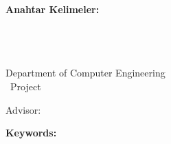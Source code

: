 \abstractTextTurkish

{\bfseries Anahtar Kelimeler:} \abstractKeywordsTurkish

\newpage
\chapter*{\eabstract}

\begin{center}
{\bfseries \Large\titleEN}

\studenti \\ \studentii

Department of Computer Engineering \\ {\degree~Project}

Advisor: \advisorEN

\end{center}

\abstractTextEnglish

{\bfseries Keywords:} \abstractKeywordsEnglish

\fi
\fi

\onehalfspacing
\clearpage
{}